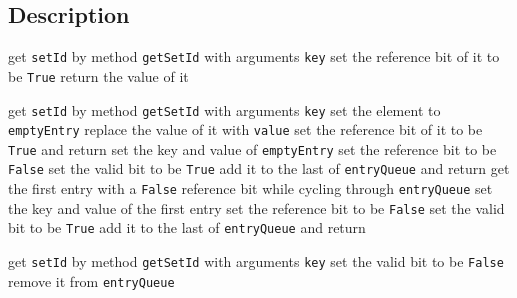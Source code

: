 \documentclass{article}
\begin{document}
\subsection{Description}
\begin{algorithm}
    \begin{algorithmic}
            \State get \texttt{setId} by method \texttt{getSetId} with arguments \texttt{key}
                    \State set the reference bit of it to be \texttt{True}
                    \State return the value of it
                \EndIf
            \EndWhile
        \EndProcedure
    \end{algorithmic}
    \begin{algorithmic}
            \State get \texttt{setId} by method \texttt{getSetId} with arguments \texttt{key}
                    \State set the element to \texttt{emptyEntry}
                \Else
                        \State replace the value of it with \texttt{value}
                        \State set the reference bit of it to be \texttt{True} and return
                    \EndIf
                \EndIf
            \EndWhile
                \State set the key and value of \texttt{emptyEntry}
                \State set the reference bit to be \texttt{False}
                \State set the valid bit to be \texttt{True}
                \State add it to the last of \texttt{entryQueue} and return
            \EndIf
            \State get the first entry with a \texttt{False} reference bit while cycling through \texttt{entryQueue}
             \State set the key and value of the first entry
             \State set the reference bit to be \texttt{False}
             \State set the valid bit to be \texttt{True}
             \State add it to the last of \texttt{entryQueue} and return
        \EndProcedure
    \end{algorithmic}
    \begin{algorithmic}
            \State get \texttt{setId} by method \texttt{getSetId} with arguments \texttt{key}
                    \State set the valid bit to be \texttt{False}
                    \State remove it from \texttt{entryQueue}
                \EndIf
            \EndWhile
        \EndProcedure
    \end{algorithmic}
\end{algorithm}
\end{document}
